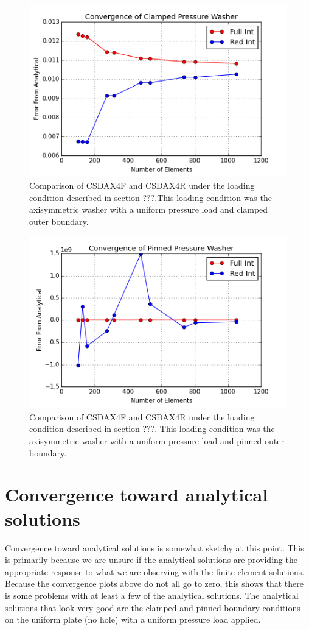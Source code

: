 \documentclass[10pt,letterpaper]{report}
\numberwithin{equation}{chapter}
\begin{document}
\begin{figure}[H]
\centering
\includegraphics[width=0.7\linewidth]{./GoodImages/Conv_WaPrCl_1}
\caption[H refinement of CSDAX4F]{Comparison of CSDAX4F and CSDAX4R under the loading condition described in section ???.This loading condition was the axisymmetric washer with a uniform pressure load and clamped outer boundary.}
\label{fig:Conv_PlPoCl_1}
\end{figure}

\begin{figure}[H]
\centering
\includegraphics[width=0.7\linewidth]{./GoodImages/Conv_WaPrPi_1}
\caption[H refinement of CSDAX4F]{Comparison of CSDAX4F and CSDAX4R under the loading condition described in section ???. This loading condition was the axisymmetric washer with a uniform pressure load and pinned outer boundary.}
\label{fig:Conv_PlPoCl_1}
\end{figure}




\section{Convergence toward analytical solutions}
Convergence toward analytical solutions is somewhat sketchy at this point. This is primarily because we are unsure if the analytical solutions are providing the appropriate response to what we are observing with the finite element solutions. Because the convergence plots above do not all go to zero, this shows that there is some problems with at least a few of the analytical solutions. The analytical solutions that look very good are the clamped and pinned boundary conditions on the uniform plate (no hole) with a uniform pressure load applied. 
\end{document}
